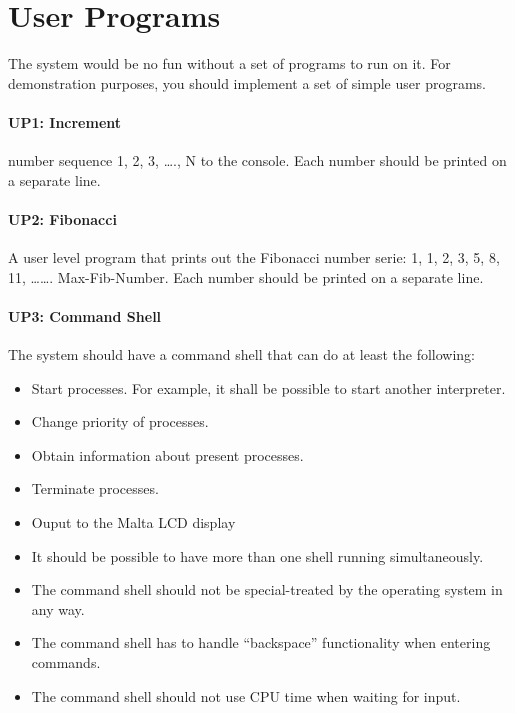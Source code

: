 \section{User Programs}

The system would be no fun without a set of programs to run on it. For demonstration purposes, you should implement a set of simple user programs.

\paragraph*{UP1: Increment}
number sequence 1, 2, 3, \ldots., N to the console. Each number should be printed on a separate line.

\paragraph*{UP2: Fibonacci}

A user level program that prints out the Fibonacci number serie: 1, 1, 2, 3, 5, 8, 11, \ldots\ldots. Max-Fib-Number. Each number should be printed on a separate line.

\paragraph*{UP3: Command Shell}

The system should have a command shell that can do at least the following:

\begin{itemize}
  \item Start processes. For example, it shall be possible to start another interpreter.
  \item  Change priority of processes.
  \item  Obtain information about present processes.
  \item  Terminate processes.
  \item  Ouput to the Malta LCD display
  \item  It should be possible to have more than one shell running simultaneously.
  \item  The command shell should not be special-treated by the operating system in any way.
  \item  The command shell has to handle ``backspace'' functionality when entering commands.
  \item  The command shell should not use CPU time when waiting for input.
\end{itemize}


